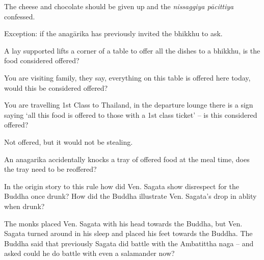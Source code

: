 \begin{solution}
  The cheese and chocolate should be given up and the \emph{nissaggiya pācittiya} confessed.

  Exception: if the anagārika has previously invited the bhikkhu to ask.
\end{solution}

\bigskip


A lay supported lifts a corner of a table to offer all the dishes to a bhikkhu,
is the food considered offered?

\bigskip

You are visiting family, they say, everything on this table is offered here
today, would this be considered offered?

\bigskip

You are travelling 1st Class to Thailand, in the departure lounge there is a
sign saying ‘all this food is offered to those with a 1st class ticket’ – is
this considered offered?

\begin{solution}
  Not offered, but it would not be stealing.
\end{solution}

\bigskip

An anagarika accidentally knocks a tray of offered food at the meal time, does
the tray need to be reoffered?

\bigskip


In the origin story to this rule how did Ven. Sagata show disrespect for the
Buddha once drunk? How did the Buddha illustrate Ven. Sagata’s drop in ablity
when drunk?

\begin{solution}
  The monks placed Ven. Sagata with his head towards the Buddha, but Ven. Sagata
  turned around in his sleep and placed his feet towards the Buddha. The Buddha
  said that previously Sagata did battle with the Ambatittha naga – and asked
  could he do battle with even a salamander now?
\end{solution}

